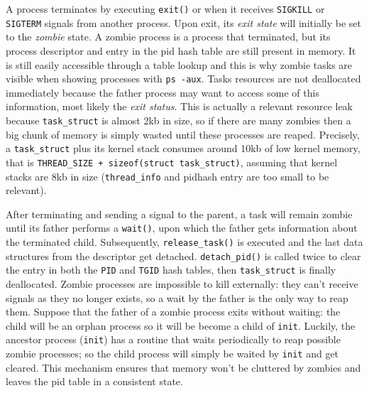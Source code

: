 \documentclass[10pt]{book}
\begin{document}
A process terminates by executing \verb|exit()| or when it receives \verb|SIGKILL| or \verb|SIGTERM| signals from another process. Upon exit, its \textit{exit state} will initially be set to the \textit{zombie} state. A zombie process is a process that terminated, but its process descriptor and entry in the pid hash table are still present in memory. It is still easily accessible through a table lookup and this is why zombie tasks are visible when showing processes with \verb|ps -aux|. Tasks resources are not deallocated immediately because the father process may want to access some of this information, most likely the \textit{exit status}. This is actually a relevant resource leak because \verb|task_struct| is almost 2kb in size, so if there are many zombies then a big chunk of memory is simply wasted until these processes are reaped. Precisely, a \verb|task_struct| plus its kernel stack consumes around 10kb of low kernel memory, that is \verb|THREAD_SIZE + sizeof(struct task_struct)|\cite{pid_h}, assuming that kernel stacks are 8kb in size (\verb|thread_info| and pidhash entry are too small to be relevant).

After terminating and sending a signal to the parent, a task will remain zombie until its father performs a \verb|wait()|, upon which the father gets information about the terminated child. Subsequently, \verb|release_task()| is executed and the last data structures from the descriptor get detached. \verb|detach_pid()| is called twice to clear the entry in both the \verb|PID| and \verb|TGID| hash tables, then \verb|task_struct| is finally deallocated. Zombie processes are impossible to kill externally: they can't receive signals as they no longer exists, so a wait by the father is the only way to reap them. Suppose that the father of a zombie process exits without waiting: the child will be an orphan process so it will be become a child of \verb|init|. Luckily, the ancestor process (\verb|init|) has a routine that waits periodically to reap possible zombie processes; so the child process will simply be waited by \verb|init| and get cleared. This mechanism ensures that memory won't be cluttered by zombies and leaves the pid table in a consistent state.
\end{document}
